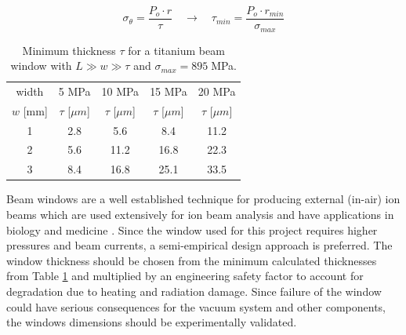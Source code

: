 \documentclass[final,3p,times,twocolumn]{elsarticle} %
\begin{document}
\begin{equation}
\sigma_{\theta} = \frac{P_o\cdot r}{\tau} \quad \longrightarrow \quad \tau_{min} = \frac{P_o\cdot r_{min}}{\sigma_{max}}
\label{eq:ThinCylinder}
\end{equation}


\begin{table}
\begin{center}
\begin{tabular}{|c|c|c|c|c|}
  \hline
width & 5 MPa  &  10 MPa  &  15 MPa  &  20 MPa \\
$w$ [mm]  &  $\tau$ [$\mu{m}$]  &  $\tau$ [$\mu{m}$]   &  $\tau$ [$\mu{m}$]   & $ \tau$ [$\mu{m}$] \\ \hline
1 & 2.8 & 5.6 & 8.4 & 11.2 \\
2 & 5.6 & 11.2 & 16.8 & 22.3 \\
3 & 8.4 & 16.8 & 25.1 & 33.5 \\
\hline
\end{tabular}
\caption{Minimum thickness $\tau$ for a titanium beam window with $L \gg w \gg \tau $ and $\sigma_{max} = 895\;$MPa.}
\label{tab:MinThickness}
\end{center}
\end{table}

Beam windows are a well established technique for producing external (in-air) ion beams which are used extensively for ion beam analysis \cite{Doyle} and have applications in biology and medicine \cite{Maehaut}.  Since the window used for this project requires higher pressures and beam currents,  a semi-empirical design approach is preferred.  The window thickness should be chosen from the minimum calculated thicknesses from Table \ref{tab:MinThickness} and multiplied by an engineering safety factor to account for degradation due to heating and radiation damage.  Since failure of the window could have serious consequences for the vacuum system and other components, the windows dimensions should be experimentally validated.
\end{document}
